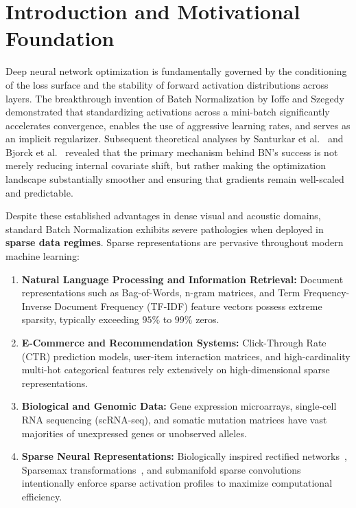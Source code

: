 \documentclass[twocolumn,10pt]{article}
\begin{document}
\section{Introduction and Motivational Foundation}
\label{sec:intro}

Deep neural network optimization is fundamentally governed by the conditioning of the loss surface and the stability of forward activation distributions across layers. The breakthrough invention of Batch Normalization by Ioffe and Szegedy~\cite{ioffe2015batch} demonstrated that standardizing activations across a mini-batch significantly accelerates convergence, enables the use of aggressive learning rates, and serves as an implicit regularizer. Subsequent theoretical analyses by Santurkar et al.~\cite{santurkar2018how} and Bjorck et al.~\cite{bjorck2018understanding} revealed that the primary mechanism behind BN's success is not merely reducing internal covariate shift, but rather making the optimization landscape substantially smoother and ensuring that gradients remain well-scaled and predictable.

Despite these established advantages in dense visual and acoustic domains, standard Batch Normalization exhibits severe pathologies when deployed in \textbf{sparse data regimes}. Sparse representations are pervasive throughout modern machine learning:
\begin{enumerate}
    \item \textbf{Natural Language Processing and Information Retrieval:} Document representations such as Bag-of-Words, n-gram matrices, and Term Frequency-Inverse Document Frequency (TF-IDF) feature vectors possess extreme sparsity, typically exceeding $95\%$ to $99\%$ zeros.
    \item \textbf{E-Commerce and Recommendation Systems:} Click-Through Rate (CTR) prediction models, user-item interaction matrices, and high-cardinality multi-hot categorical features rely extensively on high-dimensional sparse representations.
    \item \textbf{Biological and Genomic Data:} Gene expression microarrays, single-cell RNA sequencing (scRNA-seq), and somatic mutation matrices have vast majorities of unexpressed genes or unobserved alleles.
    \item \textbf{Sparse Neural Representations:} Biologically inspired rectified networks~\cite{glorot2011deep}, Sparsemax transformations~\cite{martins2016softmax}, and submanifold sparse convolutions~\cite{graham2017submanifold} intentionally enforce sparse activation profiles to maximize computational efficiency.
\end{enumerate}
\end{document}
